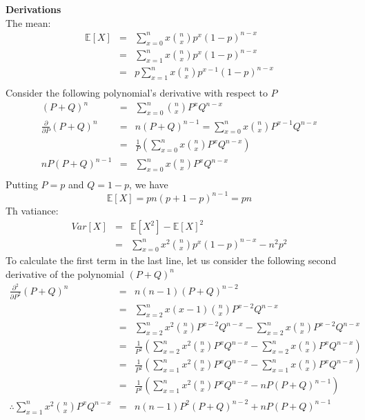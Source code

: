 \documentclass{article}
\begin{document}
\textbf{Derivations}\\
The mean:
\begin{eqnarray}
\mathbb{E}[X]  & = & \sum_{x=0}^{n} x \binom{n}{x}p^{x}(1-p)^{n-x}\\
               & = & \sum_{x=1}^{n} x \binom{n}{x} p^{x}(1-p)^{n-x}\\
               & = & p \sum_{x=1}^{n} x \binom{n}{x} p^{x-1}(1-p)^{n-x}\\
\end{eqnarray}
Consider the following polynomial's derivative with respect to $P$
\begin{eqnarray}
(P + Q)^{n} & = & \sum_{x=0}^{n} \binom{n}{x}P^{x}Q^{n-x}\\
\frac{\partial}{\partial P}(P + Q)^{n} & = & n(P + Q)^{n-1} = \sum_{x=0}^{n} x \binom{n}{x}P^{x-1}Q^{n-x} \\
                                       & = & \frac{1}{P} \left( \sum_{x=0}^{n} x \binom{n}{x}P^{x}Q^{n-x}\right)\\
 nP(P + Q)^{n-1} & = &  \sum_{x=0}^{n} x \binom{n}{x}P^{x}Q^{n-x}\\
\end{eqnarray}
Putting $P=p$ and $Q=1-p$, we have
\begin{equation}
\mathbb{E}[X] = pn(p+1-p)^{n-1} = pn
\end{equation}
Th vatiance:
\begin{eqnarray}
Var[X] & = & \mathbb{E}[X^{2}] - \mathbb{E}[X]^{2}\\
       & = & \sum_{x=0}^{n} x^{2} \binom{n}{x}p^{x}(1-p)^{n-x} - n^{2}p^{2}
\end{eqnarray}
To calculate the first term in the last line, let us consider the following second derivative of the polynomial $(P+Q)^{n}$
\begin{eqnarray}
\frac{\partial^{2}}{\partial P^{2}}(P + Q)^{n} & = & n(n-1)(P + Q)^{n-2} \nonumber\\ 
                                               & = & \sum_{x=2}^{n} x(x-1) \binom{n}{x}P^{x-2}Q^{n-x} \nonumber\\
                                               & = & \sum_{x=2}^{n} x^{2} \binom{n}{x}P^{x-2}Q^{n-x} - \sum_{x=2}^{n} x \binom{n}{x}P^{x-2}Q^{n-x} \nonumber\\
                                               & = & \frac{1}{P^{2}} \left( \sum_{x=2}^{n} x^{2} \binom{n}{x}P^{x}Q^{n-x} - \sum_{x=2}^{n} x \binom{n}{x}P^{x}Q^{n-x} \right) \nonumber\\
                                               & = & \frac{1}{P^{2}} \left( \sum_{x=1}^{n} x^{2} \binom{n}{x}P^{x}Q^{n-x} - \sum_{x=1}^{n} x \binom{n}{x}P^{x}Q^{n-x} \right) \nonumber\\
                                               & = & \frac{1}{P^{2}} \left( \sum_{x=1}^{n} x^{2} \binom{n}{x}P^{x}Q^{n-x} - nP(P+Q)^{n-1} \right) \nonumber\\
\therefore \sum_{x=1}^{n} x^{2} \binom{n}{x}P^{x}Q^{n-x} & = & n(n-1)P^{2}(P + Q)^{n-2} + nP(P+Q)^{n-1} \nonumber
\end{eqnarray}
\end{document}
